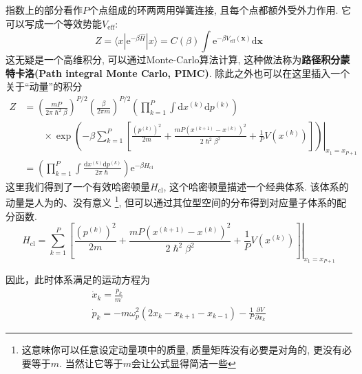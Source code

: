         指数上的部分看作$P$个点组成的环两两用弹簧连接, 且每个点都额外受外力作用. 它可以写成一个等效势能$V_\mathrm{eff}$:
        \begin{equation}
            Z = \langle x|\mathrm{e}^{-\beta \hat{H}}|x\rangle = C(\beta) \int \mathrm{e}^{-\beta V_\mathrm{eff}(\bm{x})} \mathrm{d}\bm{x}
        \end{equation}
        这无疑是一个高维积分, 可以通过Monte-Carlo算法计算, 这种做法称为\textbf{路径积分蒙特卡洛(Path integral Monte Carlo, PIMC)}. 
        除此之外也可以在这里插入一个关于“动量”的积分
        \begin{equation}\begin{aligned}
            Z &= \left(\frac{mP}{2\pi \hslash^2 \beta}\right)^{P/2} \left(\frac{\beta}{2\pi m}\right)^{P/2} \left( \prod_{k=1}^{P} \int \mathrm{d} x^{(k)} \mathrm{d} p^{(k)} \right) \\ & \qquad\times\left.
            \exp\left( -\beta \sum_{k=1}^{P} \left[\frac{(p^{(k)})^2}{2m}+\frac{mP(x^{(k+1)}-x^{(k)})^2}{2\hslash^2 \beta^2}+\frac{1}{P}V(x^{(k)})\right]\right)\right|_{x_1 = x_{P+1}} \\
            &= \left( \prod_{k=1}^{P} \int \frac{\mathrm{d} x^{(k)} \mathrm{d} p^{(k)}}{2\pi\hslash}  \right) \mathrm{e}^{-\beta H_\mathrm{cl}}
        \end{aligned}\end{equation}
        这里我们得到了一个有效哈密顿量$H_\mathrm{cl}$, 这个哈密顿量描述一个经典体系. 该体系的动量是人为的、没有意义
        \footnote{这意味你可以任意设定动量项中的质量, 质量矩阵没有必要是对角的, 更没有必要等于$m$. 当然让它等于$m$会让公式显得简洁一些}, 
        但可以通过其位型空间的分布得到对应量子体系的配分函数. 
        \begin{equation}
            H_\mathrm{cl} = \left. \sum_{k=1}^{P} \left[\frac{(p^{(k)})^2}{2m}+\frac{mP(x^{(k+1)}-x^{(k)})^2}{2\hslash^2 \beta^2}+\frac{1}{P}V(x^{(k)})\right] \right|_{x_1 = x_{P+1}}
        \end{equation}

        因此，此时体系满足的运动方程为
        \begin{equation}
            \begin{gathered}
            \dot{x}_{k}=\frac{p_{k}}{m^{\prime}} \\
            \dot{p}_{k}=-m \omega_{p}^{2}\left(2 x_{k}-x_{k+1}-x_{k-1}\right)-\frac{1}{P} \frac{\partial V}{\partial x_{k}}
            \end{gathered}
        \end{equation}

